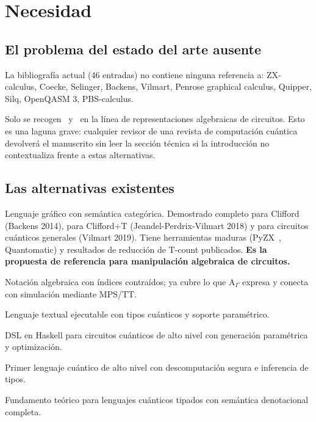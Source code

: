 \documentclass[12pt, a4paper]{article}
\newcommand{\gate}[1]{\text{#1}}
\begin{document}
\section{Necesidad}

\subsection{El problema del estado del arte ausente}

La bibliografía actual (46 entradas) no contiene ninguna referencia a:
ZX-calculus, Coecke, Selinger, Backens, Vilmart, Penrose graphical calculus,
Quipper, Silq, OpenQASM 3, PBS-calculus.

Solo se recogen~\cite{Hutsell} y~\cite{Staton} en la línea de representaciones
algebraicas de circuitos. Esto es una laguna grave: cualquier revisor de una
revista de computación cuántica devolverá el manuscrito sin leer la sección
técnica si la introducción no contextualiza frente a estas alternativas.

\subsection{Las alternativas existentes}

\begin{description}[leftmargin=2cm, style=nextline]
  \item[ZX-calculus~\cite{CoeckeDuncan2008, Backens2014, JeandelvPerdrix2018}]
        Lenguaje gráfico con semántica categórica. Demostrado completo para Clifford
        (Backens 2014), para Clifford+T (Jeandel-Perdrix-Vilmart 2018) y para
        circuitos cuánticos generales (Vilmart 2019). Tiene herramientas maduras
        (PyZX~\cite{KissingerWetering2019}, Quantomatic) y resultados de reducción
        de T-count publicados. \textbf{Es la propuesta de referencia para
          manipulación algebraica de circuitos.}

  \item[Tensor network notation / Penrose]
        Notación algebraica con índices contraídos; ya cubre lo que
        $\gate{A}_\Gamma$ expresa y conecta con simulación mediante MPS/TT.

  \item[OpenQASM 3~\cite{CrossOQASM2022}]
        Lenguaje textual ejecutable con tipos cuánticos y soporte paramétrico.

  \item[Quipper~\cite{GreenQuipper2013}]
        DSL en Haskell para circuitos cuánticos de alto nivel con generación
        paramétrica y optimización.

  \item[Silq~\cite{BichselSilq2020}]
        Primer lenguaje cuántico de alto nivel con descomputación segura e
        inferencia de tipos.

  \item[Lambda-cálculo cuántico~\cite{SelingerValiron2006}]
        Fundamento teórico para lenguajes cuánticos tipados con
        semántica denotacional completa.
\end{description}
\end{document}
